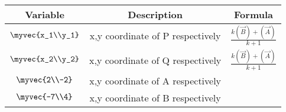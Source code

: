 \begin{tabular}[12pt]{ |c| c |c|}
    \hline
    \textbf{Variable} & \textbf{Description} & \textbf{Formula}\\ 
    \hline
    $\myvec{x_1\\y_1}$ & x,y coordinate of P respectively & $\frac{k(\vec{B})+(\vec{A})}{k+1}$ \\
    \hline 
    $\myvec{x_2\\y_2}$ & x,y coordinate of Q respectively & $\frac{k(\vec{B})+(\vec{A})}{k+1}$ \\
    \hline  
    $\myvec{2\\-2}$ & x,y coordinate of A respectively & \\
    \hline
    $\myvec{-7\\4}$ & x,y coordinate of B respectively & \\
    \hline  
    \end{tabular}

